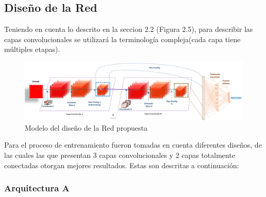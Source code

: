 	\subsection{Diseño de la Red}
	
	Teniendo en cuenta lo descrito en la seccion 2.2 (Figura 2.5), para describir las capas convolucionales se utilizará la terminología compleja(cada capa tiene múltiples etapas).
	
		\begin{figure}[H]
		\includegraphics[width=1\textwidth]{images/desarrollo/networkArquitec/designNet}
		\begin{center}
		\caption{\small{Modelo del diseño de la Red propuesta}}
		\vspace{-1em}
		{\small{\fontsize{10}{16.8}\selectfont {Fuente propia}}}
		\end{center}
		\vspace{-1.5em}
		\end{figure}


	Para el proceso de entrenamiento fueron tomadas en cuenta diferentes diseños, de las cuales las que presentan 3 capas convolucionales y 2 capas totalmente conectadas otorgan mejores resultados. Estas son descritas a continuación:

		\subsubsection{Arquitectura A} 
		
			
